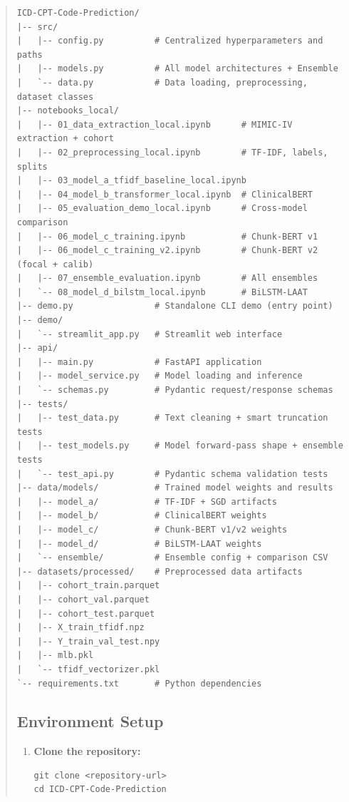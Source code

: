 \documentclass[11pt,a4paper]{article}
\begin{document}
\begin{abstract}
\begin{verbatim}
ICD-CPT-Code-Prediction/
|-- src/
|   |-- config.py          # Centralized hyperparameters and paths
|   |-- models.py          # All model architectures + Ensemble
|   `-- data.py            # Data loading, preprocessing, dataset classes
|-- notebooks_local/
|   |-- 01_data_extraction_local.ipynb      # MIMIC-IV extraction + cohort
|   |-- 02_preprocessing_local.ipynb        # TF-IDF, labels, splits
|   |-- 03_model_a_tfidf_baseline_local.ipynb
|   |-- 04_model_b_transformer_local.ipynb  # ClinicalBERT
|   |-- 05_evaluation_demo_local.ipynb      # Cross-model comparison
|   |-- 06_model_c_training.ipynb           # Chunk-BERT v1
|   |-- 06_model_c_training_v2.ipynb        # Chunk-BERT v2 (focal + calib)
|   |-- 07_ensemble_evaluation.ipynb        # All ensembles
|   `-- 08_model_d_bilstm_local.ipynb       # BiLSTM-LAAT
|-- demo.py                # Standalone CLI demo (entry point)
|-- demo/
|   `-- streamlit_app.py   # Streamlit web interface
|-- api/
|   |-- main.py            # FastAPI application
|   |-- model_service.py   # Model loading and inference
|   `-- schemas.py         # Pydantic request/response schemas
|-- tests/
|   |-- test_data.py       # Text cleaning + smart truncation tests
|   |-- test_models.py     # Model forward-pass shape + ensemble tests
|   `-- test_api.py        # Pydantic schema validation tests
|-- data/models/           # Trained model weights and results
|   |-- model_a/           # TF-IDF + SGD artifacts
|   |-- model_b/           # ClinicalBERT weights
|   |-- model_c/           # Chunk-BERT v1/v2 weights
|   |-- model_d/           # BiLSTM-LAAT weights
|   `-- ensemble/          # Ensemble config + comparison CSV
|-- datasets/processed/    # Preprocessed data artifacts
|   |-- cohort_train.parquet
|   |-- cohort_val.parquet
|   |-- cohort_test.parquet
|   |-- X_train_tfidf.npz
|   |-- Y_train_val_test.npy
|   |-- mlb.pkl
|   `-- tfidf_vectorizer.pkl
`-- requirements.txt       # Python dependencies
\end{verbatim}

\subsection{Environment Setup}

\begin{enumerate}[leftmargin=1.5em]
    \item \textbf{Clone the repository:}
\begin{verbatim}
git clone <repository-url>
cd ICD-CPT-Code-Prediction
\end{verbatim}


\end{enumerate}
\end{abstract}
\end{document}

